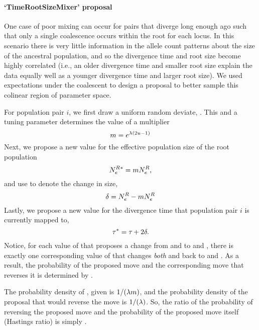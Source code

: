 \paragraph{`TimeRootSizeMixer' proposal}
One case of poor mixing can occur for pairs that diverge long enough ago such
that only a single coalescence occurs within the root for each locus.
In this scenario there is very little information in the allele count patterns
about the size of the ancestral population, and so the divergence time and root
size become highly correlated (i.e., an older divergence time and smaller root
size explain the data equally well as a younger divergence time and larger root
size).
We used expectations under the coalescent to design a proposal to better sample
this colinear region of parameter space.

For population pair $i$, we first draw a uniform random deviate, \uniformdeviate.
This and a tuning parameter \tuningparameter determines the value of a multiplier
\[
    \multiplier = e^{\tuningparameter(2\uniformdeviate - 1)}
\]
Next, we propose a new value for the effective population size of the
root population
\[
    \epopsize[\rootpopindex]{}\proposed = \multiplier\epopsize[\rootpopindex],
\]
and use \sizechange to denote the change in size,
\[
    \sizechange = \epopsize[\rootpopindex] - \multiplier\epopsize[\rootpopindex]
\]
Lastly, we propose a new value for the divergence time that population pair $i$
is currently mapped to,
\[
    \divtime\proposed = \divtime + 2\sizechange.
\]
Notice, for each value of \multiplier that proposes a change from
\epopsize[\rootpopindex] and \divtime to 
\epopsize[\rootpopindex]{}\proposed and \divtime\proposed,
there is exactly one corresponding value of \multiplier that
changes \emph{both}
\epopsize[\rootpopindex]{}\proposed and \divtime\proposed
back to 
\epopsize[\rootpopindex] and \divtime.
As a result, the probability of the proposed move and the corresponding move
that reverses it is determined by \multiplier.

The probability density of \multiplier, given \tuningparameter is
$1/(\tuningparameter\multiplier)$,
and the probability density of the proposal that would reverse the
move is $1/(\tuningparameter)$.
So, the ratio of the probability of reversing the proposed move and the
probability of the proposed move itself (Hastings ratio) is simply \multiplier.

